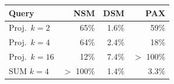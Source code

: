 \begin{tabular}{lrrr}
\toprule
Query & NSM & DSM & PAX \\
\midrule
Proj.\ $k{=}2$ & 65\% & 1.6\% & 59\% \\
Proj.\ $k{=}4$ & 64\% & 2.4\% & 18\% \\
Proj.\ $k{=}16$ & 12\% & 7.4\% & $>$ 100\% \\
SUM $k{=}4$ & $>$ 100\% & 1.4\% & 3.3\% \\
\bottomrule
\end{tabular}
